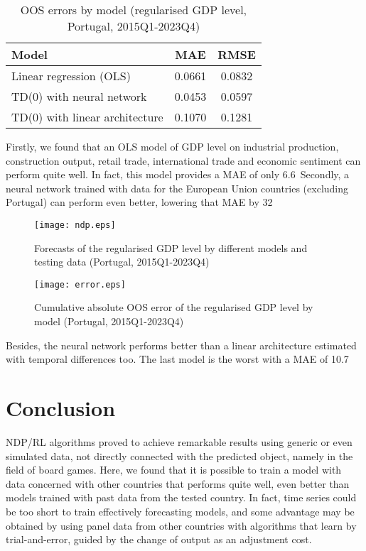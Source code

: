 \begin{table}[h!]
	\caption{OOS errors by model (regularised GDP level, Portugal, 2015Q1-2023Q4)} 
	\label{tab:findings} 
	\centering
	\begin{tabular}{lcc}
		  \hline
        Model                           & MAE     & RMSE   \\
	      \hline	
        Linear regression (OLS)         & 0.0661  & 0.0832 \\
		TD(0) with neural network       & 0.0453  & 0.0597 \\
        TD(0) with linear architecture  & 0.1070  & 0.1281 \\
        \hline
    \end{tabular}
\end{table}

Firstly, we found that an OLS model of GDP level on industrial production, construction output, retail trade, international trade and economic sentiment can perform quite well. In fact, this model provides a MAE of only 6.6\
Secondly, a neural network trained with data for the European Union countries (excluding Portugal) can perform even better, lowering that MAE by 32\

\begin{figure}[!h]
	\centering
	\texttt{[image: ndp.eps]}
	\caption{Forecasts of the regularised GDP level by different models and testing data (Portugal, 2015Q1-2023Q4)}
	\label{fig:NDP}
\end{figure}

\begin{figure}[!h]
	\centering
	\texttt{[image: error.eps]}
	\caption{Cumulative absolute OOS error of the regularised GDP level by model  (Portugal, 2015Q1-2023Q4)}
	\label{fig:error}
\end{figure}

Besides, the neural network performs better than a linear architecture estimated with temporal differences too. The last model is the worst with a MAE of 10.7\

\section{Conclusion}
\label{sec:conclusion}

NDP/RL algorithms proved to achieve remarkable results using generic or even simulated data, not directly connected with the predicted object, namely in the field of board games. Here, we found that it is possible to train a model with data concerned with other countries that performs quite well, even better than models trained with past data from the tested country. In fact, time series could be too short to train effectively forecasting models, and some advantage may be obtained by using panel data from other countries with  algorithms that learn by trial-and-error, guided by the change of output as an adjustment cost. 


